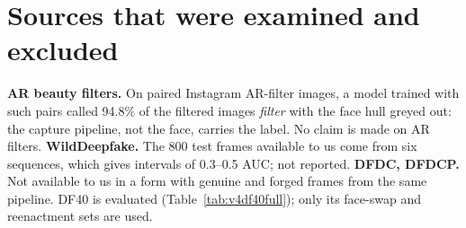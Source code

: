 \documentclass[10pt]{article}
\begin{document}
\section{Sources that were examined and excluded}
\textbf{AR beauty filters.} On paired Instagram AR-filter images, a model trained with such pairs called 94.8\% of the
filtered images \emph{filter} with the face hull greyed out: the capture pipeline, not the face, carries the label. No
claim is made on AR filters.
\textbf{WildDeepfake.} The 800 test frames available to us come from six sequences, which gives intervals of
0.3--0.5 AUC; not reported.
\textbf{DFDC, DFDCP.} Not available to us in a form with genuine and forged frames from the same pipeline. DF40 is
evaluated (Table~\ref{tab:v4df40full}); only its face-swap and reenactment sets are used.



\end{document}
